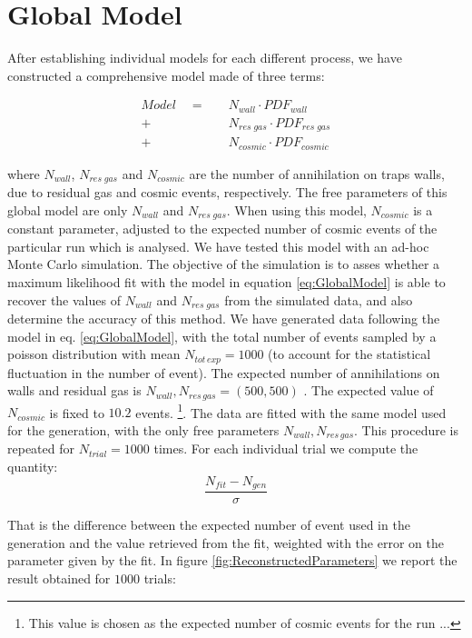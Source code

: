\documentclass[11pt,a4paper,oneside]{article}
\begin{document}
\section*{Global Model}

After establishing individual models for each different process, we have constructed a comprehensive model made of three terms:

\begin{equation} \label{eq:GlobalModel}
\begin{split}
Model \quad = \quad &N_{wall} \cdot PDF_{wall} \\
	+ &N_{res \; gas} \cdot PDF_{res \; gas}\\ 
	+ &N_{cosmic} \cdot PDF_{cosmic}
\end{split} 
\end{equation} 

where $N_{wall}$, $N_ {res \; gas}$ and $N_{cosmic}$ are the number of annihilation on traps walls, due to residual gas and cosmic events, respectively.
The free parameters of this global model are only $N_{wall}$ and $N_{res \; gas}$. When using this model, $N_{cosmic}$ is a constant parameter, adjusted to the expected number of cosmic events of the particular run which is analysed.
We have tested this model with an ad-hoc Monte Carlo simulation. The objective of the simulation is to asses whether a maximum likelihood fit with the model in equation \ref{eq:GlobalModel} is able to recover the values of $N_{wall}$ and $N_{res \; gas}$ from the simulated data, and also determine the accuracy of this method. 
We have generated data following the model in eq. \ref{eq:GlobalModel}, with the total number of events sampled by a poisson distribution with mean $N_{tot \, exp} = 1000$ (to account for the statistical fluctuation in the number of event). The expected number of annihilations on walls and residual gas is $N_{wall} , N_{res \, gas} = (500,500)$ . The expected value of $N_{cosmic}$ is fixed to $10.2$ events. \footnote{ This value is chosen as the expected number of cosmic events for the run ...}.
The data are fitted with the same model used for the generation, with the only free parameters $N_{wall} , N_{res \, gas}$. This procedure is repeated for $N_{trial} = 1000$ times. For each individual trial we compute the quantity:
\begin{equation} \label{eq:ParmasReco}
\dfrac{N_{fit} - N_{gen}}{\sigma}
\end{equation}

That is the difference between the expected number of event used in the generation and the value retrieved from the fit, weighted with the error on the parameter given by the fit. In figure \ref{fig:ReconstructedParameters} we report the result obtained for $1000$ trials: 
\end{document}
